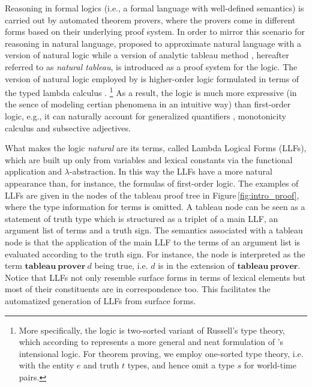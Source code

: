 \documentclass[11pt]{article}
\newcommand{\synt}[1]{\textbf{#1}}
\begin{document}
Reasoning in formal logics (i.e., a formal language with well-defined semantics) is carried out by automated theorem provers, where the provers come in different forms based on their underlying proof system.
In order to mirror this scenario for reasoning in natural language,  proposed to approximate natural language with a version of natural logic \cite{lakoff:70,essays:86,valencia91categorial} while a version of analytic tableau method \cite{beth:55,Hintikka:55,smullyan:1968}, hereafter referred to as {\em natural tableau}, is introduced as a proof system for the logic.
The version of natural logic employed by  is higher-order logic formulated in terms of the typed lambda calculus \cite{church:1940}.%
%
\footnote{More specifically, the logic is two-sorted variant of Russell's type theory, which according to  represents a more general and neat formulation of 's intensional logic.
For theorem proving, we employ one-sorted type theory, i.e. with the entity $e$ and truth $t$ types, and hence omit a type $s$ for world-time pairs. 
} 
As a result, the logic is much more expressive (in the sence of modeling certian phenomena in an intuitive way) than first-order logic, e.g., it can naturally account for generalized quantifiers \cite{montague73:PTQ,BarwiseCooper:81}, monotonicity calculus \cite{essays:86,valencia91categorial,icardiMoss:14} and subsective adjectives.


What makes the logic {\em natural} are its terms, called Lambda Logical Forms (LLFs), which are built up only from variables and lexical constants via the functional application and $\lambda$-abstraction.
In this way the LLFs have a more natural appearance than, for instance, the formulas of first-order logic.
The examples of LLFs are given in the nodes of the tableau proof tree in Figure\,\ref{fig:intro_proof}, where the type information for terms is omitted.
A tableau node can be seen as a statement of truth type which is structured as a triplet of a main LLF, an argument list of terms and a truth sign.
The semantics associated with a tableau node is that the application of the main LLF to the terms of an argument list is evaluated according to the truth sign.
For instance, the node  is interpreted as the term $\synt{tableau}~\synt{prover}~d$ being true, i.e. $d$ is in the extension of $\synt{tableau}~\synt{prover}$. 
Notice that LLFs not only resemble surface forms in terms of lexical elements but most of their constituents are in correspondence too.
This facilitates the automatized generation of LLFs from surface forms.
\end{document}
